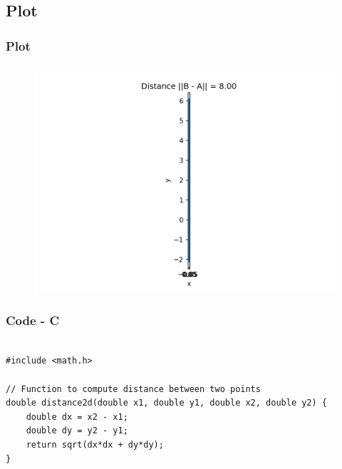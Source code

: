 \documentclass{beamer}
\theoremstyle{remark}
\numberwithin{equation}{section}
\begin{document}
\subsection{Plot}
\begin{frame}
    \frametitle{Plot}
\begin{figure}[H]
   \centering
   \includegraphics[width=0.9\columnwidth]{figs/distance.png}
   \end{figure}
\end{frame}

\begin{frame}[fragile]
    \frametitle{Code - C}
    \begin{lstlisting}

#include <math.h>

// Function to compute distance between two points
double distance2d(double x1, double y1, double x2, double y2) {
    double dx = x2 - x1;
    double dy = y2 - y1;
    return sqrt(dx*dx + dy*dy);
}



\end{lstlisting}
\end{frame}
\end{document}
